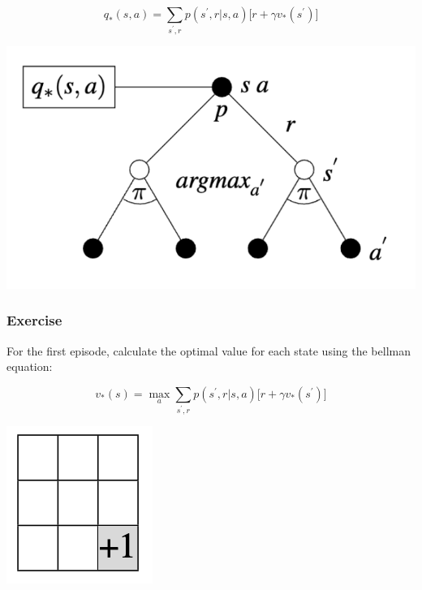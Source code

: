 \documentclass[
  letterpaper,
  DIV=11,
  numbers=noendperiod]{scrreprt}
\begin{document}
\[
q_{*}(s, a) = \sum_{s^{'}, r} p(s^{'},r|s,a) \big[ r + \gamma v_{*}(s^{'}) \big]
\]

\begin{center}
\includegraphics[width=0.35\linewidth,height=\textheight,keepaspectratio]{lecture4/images/OptimActionValue.png}
\end{center}

\subsubsection{Exercise}\label{exercise-10}

For the first episode, calculate the optimal value for each state using
the bellman equation:

\[
v_{*}(s) = \max_{a} \sum_{s^{'}, r} p(s^{'},r|s,a) \big[ r + \gamma v_{*}(s^{'}) \big]
\]

\begin{center}
\includegraphics[width=0.13\linewidth,height=\textheight,keepaspectratio]{lecture4/images/GridWorldEmpty-ex.png}
\end{center}
\end{document}
